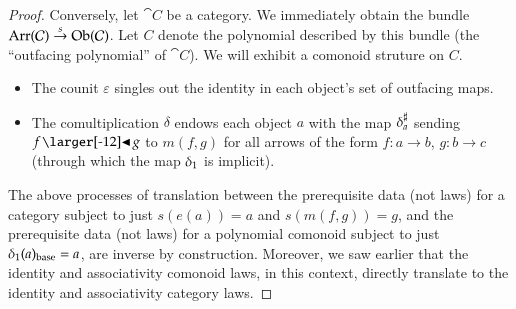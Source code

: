 \documentclass{amsart}
\begin{document}
\begin{proof}
  Conversely, let $\cat{C}$ be a category. We immediately obtain the
  bundle ${\operatorname{Arr}(\mathcal{C})\overset{s}{\to}\operatorname{Ob}(\mathcal{C})}$. Let $C$ denote
  the polynomial described by this bundle (the ``outfacing polynomial''
  of $\cat{C}$). We will exhibit a comonoid struture on $C$.
  \begin{itemize}
  \item The counit $\varepsilon$ singles out the identity in each
    object's set of outfacing maps.
  \item The comultiplication $\delta$ endows each object $a$ with the
    map ${\delta}^\sharp_{a}$ sending $f \subd g$ to $m(f, g)$ for all
    arrows of the form $f: a \to b$, $g: b \to c$ (through which the
    map ${\delta}_1$ is implicit).
  \end{itemize}

  The above processes of translation between the prerequisite data
  (not laws) for a category subject to just $s(e(a)) = a$ and
  $s(m(f, g)) = g$, and the prerequisite data (not laws) for a
  polynomial comonoid subject to just
  ${\delta}_1(a)_{\mathrm{base}} = a$, are inverse by
  construction. Moreover, we saw earlier that the identity and
  associativity comonoid laws, in this context, directly translate
  to the identity and associativity category laws.
\end{proof}
\end{document}
